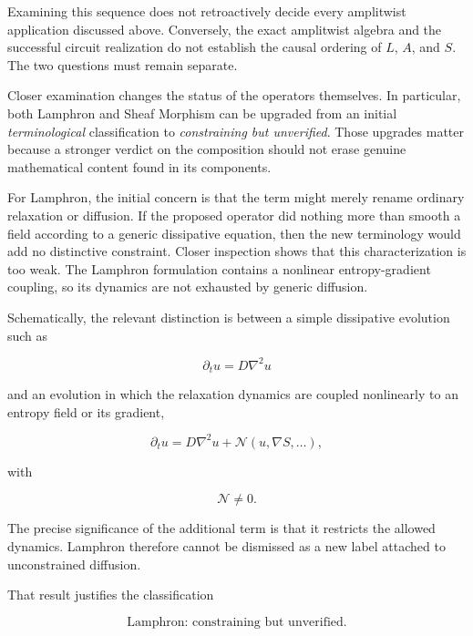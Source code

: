 \documentclass[11pt]{article}
\begin{document}
Examining this sequence does not retroactively decide every amplitwist application discussed above. Conversely, the exact amplitwist algebra and the successful circuit realization do not establish the causal ordering of $L$, $A$, and $S$. The two questions must remain separate.

Closer examination changes the status of the operators themselves. In particular, both Lamphron and Sheaf Morphism can be upgraded from an initial \emph{terminological} classification to \emph{constraining but unverified}. Those upgrades matter because a stronger verdict on the composition should not erase genuine mathematical content found in its components.

For Lamphron, the initial concern is that the term might merely rename ordinary relaxation or diffusion. If the proposed operator did nothing more than smooth a field according to a generic dissipative equation, then the new terminology would add no distinctive constraint. Closer inspection shows that this characterization is too weak. The Lamphron formulation contains a nonlinear entropy-gradient coupling, so its dynamics are not exhausted by generic diffusion.

Schematically, the relevant distinction is between a simple dissipative evolution such as

\begin{equation}
\partial_t u
=
D\nabla^2u
\end{equation}

and an evolution in which the relaxation dynamics are coupled nonlinearly to an entropy field or its gradient,

\begin{equation}
\partial_t u
=
D\nabla^2u
+
\mathcal N(u,\nabla S,\ldots),
\end{equation}

with

\begin{equation}
\mathcal N\neq0.
\end{equation}

The precise significance of the additional term is that it restricts the allowed dynamics. Lamphron therefore cannot be dismissed as a new label attached to unconstrained diffusion.

That result justifies the classification

\begin{equation}
\boxed{
\text{Lamphron: constraining but unverified}.
}
\end{equation}
\end{document}
